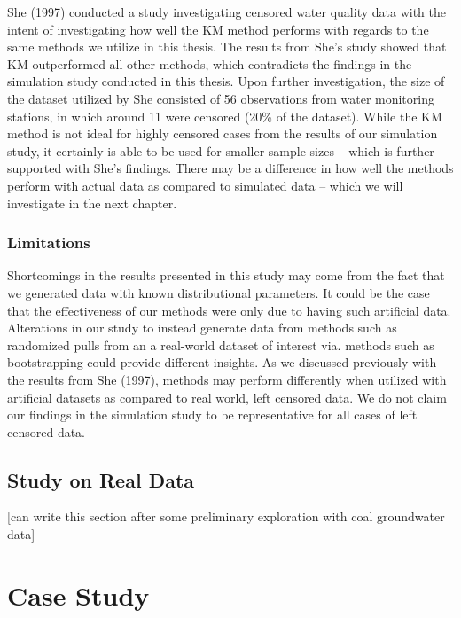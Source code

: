 \documentclass[12pt, twoside]{amherstthesis}
\begin{document}
She (1997) conducted a study investigating censored water quality data with the intent of investigating how well the KM method performs with regards to the same methods we utilize in this thesis. The results from She's study showed that KM outperformed all other methods, which contradicts the findings in the simulation study conducted in this thesis. Upon further investigation, the size of the dataset utilized by She consisted of 56 observations from water monitoring stations, in which around 11 were censored (20\% of the dataset). While the KM method is not ideal for highly censored cases from the results of our simulation study, it certainly is able to be used for smaller sample sizes -- which is further supported with She's findings. There may be a difference in how well the methods perform with actual data as compared to simulated data -- which we will investigate in the next chapter.

\hypertarget{limitations}{%
\subsection{Limitations}\label{limitations}}

Shortcomings in the results presented in this study may come from the fact that we generated data with known distributional parameters. It could be the case that the effectiveness of our methods were only due to having such artificial data. Alterations in our study to instead generate data from methods such as randomized pulls from an a real-world dataset of interest via. methods such as bootstrapping could provide different insights. As we discussed previously with the results from She (1997), methods may perform differently when utilized with artificial datasets as compared to real world, left censored data. We do not claim our findings in the simulation study to be representative for all cases of left censored data.

\hypertarget{real_data}{%
\section{Study on Real Data}\label{real_data}}

{[}can write this section after some preliminary exploration with coal groundwater data{]}

\hypertarget{casestudy}{%
\chapter{Case Study}\label{casestudy}}
\end{document}
